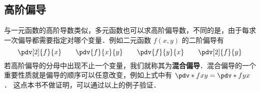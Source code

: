 \subsection{高阶偏导}
与一元函数的高阶导数类似，多元函数也可以求高阶偏导数，不同的是，由于每求一次偏导都需要指定对哪个变量．例如二元函数 $f(x,y)$ 的二阶偏导有
\begin{equation}
\pdv[2]{f}{x} \qquad
\pdv{f}{x}{y} \qquad
\pdv{f}{y}{x} \qquad
\pdv[2]{f}{y}
\end{equation}
若高阶偏导的分母中出现不止一个变量，我们就称其为\textbf{混合偏导}．混合偏导的一个重要性质就是偏导的顺序可以任意改变，例如上式中有 $\pdv*{f}{x}{y} = \pdv*{f}{y}{x}$． 这点本书不做证明，可以通过以上的例子验证．








